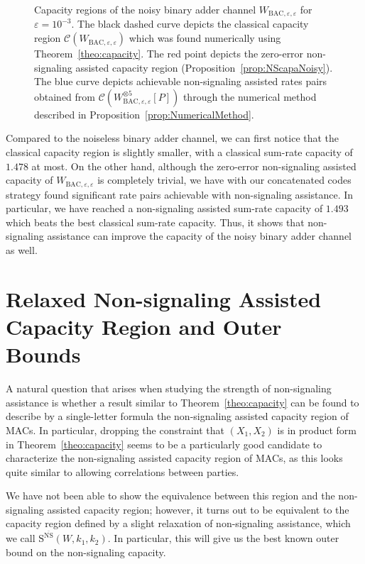 \begin{figure}[!h]
\begin{center}
      \caption{Capacity regions of the noisy binary adder channel $W_{\text{BAC},\varepsilon,\varepsilon}$ for $\varepsilon = 10^{-3}$. The black dashed curve depicts the classical capacity region $\mathcal{C}(W_{\text{BAC},\varepsilon,\varepsilon})$ which was found numerically using Theorem~\ref{theo:capacity}. The red point depicts the zero-error non-signaling assisted capacity region (Proposition~\ref{prop:NScapaNoisy}). The blue curve depicts achievable non-signaling assisted rates pairs obtained from $\mathcal{C}(W_{\text{BAC},\varepsilon,\varepsilon}^{\otimes 5}[P])$ through the numerical method described in Proposition~\ref{prop:NumericalMethod}.}
      \label{fig:noisyBAC}
    \end{center}
  \end{figure}
\shorthandon{;}
Compared to the noiseless binary adder channel, we can first notice that the classical capacity region is slightly smaller, with a classical  sum-rate capacity of $1.478$ at most. On the other hand, although the zero-error non-signaling assisted capacity of $W_{\text{BAC},\varepsilon,\varepsilon}$ is completely trivial, we have with our concatenated codes strategy found significant rate pairs achievable with non-signaling assistance. In particular, we have reached a non-signaling assisted sum-rate capacity of $1.493$ which beats the best classical sum-rate capacity. Thus, it shows that non-signaling assistance can improve the capacity of the noisy binary adder channel as well.

\section{Relaxed Non-signaling Assisted Capacity Region and Outer Bounds}
\label{section:OB}
A natural question that arises when studying the strength of non-signaling assistance is whether a result similar to Theorem~\ref{theo:capacity} can be found to describe by a single-letter formula the non-signaling assisted capacity region of MACs. In particular, dropping the constraint that $(X_1,X_2)$ is in product form in Theorem~\ref{theo:capacity} seems to be a particularly good candidate to characterize the non-signaling assisted capacity region of MACs, as this looks quite similar to allowing correlations between parties.

We have not been able to show the equivalence between this region and the non-signaling assisted capacity region; however, it turns out to be equivalent to the capacity region defined by a slight relaxation of non-signaling assistance, which we call $\mathrm{S}^{\overline{\mathrm{NS}}}(W,k_1,k_2)$. In particular, this will give us the best known outer bound on the non-signaling capacity.

